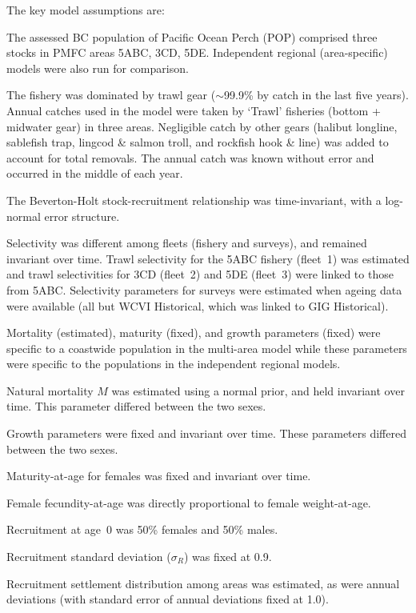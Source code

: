 \documentclass[11pt]{book}
\newcommand{\pc}{\%}
\begin{document}
The key model assumptions are:
\begin{enumerate_csas}{}{}
\item The assessed BC population of Pacific Ocean Perch (POP) comprised three stocks in PMFC areas 5ABC, 3CD, 5DE. Independent regional (area-specific) models were also run for comparison.
\item The \spc{} fishery was dominated by trawl gear ($\sim$99.9\pc{} by catch in the last five years). Annual catches used in the model were taken by `Trawl' fisheries (bottom + midwater gear) in three areas. Negligible catch by other gears (halibut longline, sablefish trap, lingcod \& salmon troll, and rockfish hook \& line) was added to account for total removals. The annual catch was known without error and occurred in the middle of each year.
\item The Beverton-Holt stock-recruitment relationship was time-invariant, with a log-normal error structure.
\item Selectivity was different among fleets (fishery and surveys), and remained invariant over time. Trawl selectivity for the 5ABC fishery (fleet~1) was estimated and trawl selectivities for 3CD (fleet~2) and 5DE (fleet~3) were linked to those from 5ABC. Selectivity parameters for surveys were estimated when ageing data were available (all but WCVI Historical, which was linked to GIG Historical).
\item Mortality (estimated), maturity (fixed), and growth parameters (fixed) were specific to a coastwide population in the multi-area model while these parameters were specific to the populations in the independent regional models.
\item Natural mortality $M$ was estimated using a normal prior, and held invariant over time. This parameter differed between the two sexes.
\item Growth parameters were fixed and invariant over time. These parameters differed between the two sexes.
\item Maturity-at-age for females was fixed and invariant over time.
\item Female fecundity-at-age was directly proportional to female weight-at-age.
\item Recruitment at age~0 was 50\pc{} females and 50\pc{} males.
\item Recruitment standard deviation ($\sigma_R$) was fixed at 0.9.
\item Recruitment settlement distribution among areas was estimated, as were annual deviations (with standard error of annual deviations fixed at 1.0).

\end{enumerate_csas}
\end{document}
